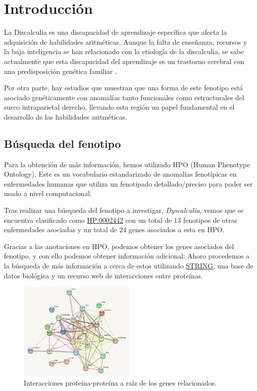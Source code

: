 \section{Introducción}

La Discalculia es una discapacidad de aprendizaje específica que afecta la adquisición de habilidades aritméticas. Aunque la falta de  enseñanza, recursos y la baja inteligencia se han relacionado con la etiología de la discalculia, se sabe actualmente que esta discapacidad del aprendizaje es un trastorno cerebral con una predisposición genética familiar \cite{Molko2003}.

\hfill

Por otra parte, hay estudios \cite{Molko2003,Shalev2001} que muestran que una forma de este fenotipo está asociado genéticamente con anomalías tanto funcionales como estructurales del surco intraparietal derecho, llevando esta región un papel fundamental en el desarrollo de las habilidades aritméticas.

\subsection{Búsqueda del fenotipo}

Para la obtención de más información, hemos utilizado HPO (Human Phenotype Ontology). Este es un vocabulario estandarizado de anomalías fenotípicas en enfermedades humanas que utiliza un fenotipado detallado/preciso para poder ser usado a nivel computacional.

\hfill

Tras realizar una búsqueda del fenotipo a investigar, \textit{Dyscalculia}, vemos que se encuentra clasificado como \href{https://hpo.jax.org/app/browse/term/HP:0002442}{HP:0002442} con un total de 13 fenotipos de otras enfermedades asociadas y un total de 24 genes asociados a esta en HPO.

\hfill

Gracias a las anotaciones en HPO, podemos obtener los genes asociados del fenotipo, y con ello podemos obtener información adicional: Ahoro procedemos a la búsqueda de más información a cerca de estos utilizando \href{https://string-db.org}{STRING}, una base de datos biológica y un recurso web de interacciones entre proteínas.

\begin{figure}[]
	\centering
	\includegraphics[width=0.50\textwidth]{figures/Gene-Relationships.PNG}
	\caption{Interacciones proteína-proteína a raíz de los genes relacionados. }
	\label{fig:string1}
\end{figure}


